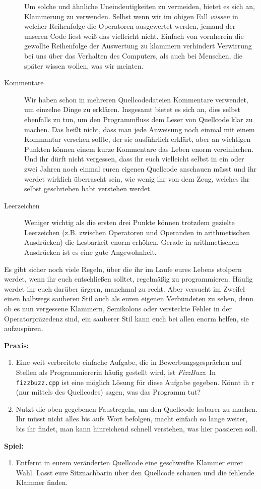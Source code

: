 \begin{description}
        Um solche und ähnliche Uneindeutigkeiten zu vermeiden, bietet es sich
        an, Klammerung zu verwenden. Selbst wenn wir im obigen Fall
        \emph{wissen} in welcher Reihenfolge die Operatoren ausgewertet werden,
        jemand der unseren Code liest weiß das vielleicht nicht. Einfach von
        vornherein die gewollte Reihenfolge der Auswertung zu klammern
        verhindert Verwirrung bei uns über das Verhalten des Computers, als
        auch bei Menschen, die später wissen wollen, was wir meinten.
    \item[Kommentare]
        Wir haben schon in mehreren Quellcodedateien Kommentare verwendet, um
        einzelne Dinge zu erklären. Insgesamt bietet es sich an, dies selbst
        ebenfalls zu tun, um den Programmfluss dem Leser von Quellcode klar zu
        machen. Das heißt nicht, dass man jede Anweisung noch einmal mit einem
        Kommantar versehen sollte, der sie ausführlich erklärt, aber an
        wichtigen Punkten können einem kurze Kommentare das Leben enorm
        vereinfachen. Und ihr dürft nicht vergessen, dass ihr euch vielleicht
        selbst in ein oder zwei Jahren noch einmal euren eigenen Quellcode
        anschauen müsst und ihr werdet wirklich überrascht sein, wie wenig ihr
        von dem Zeug, welches ihr selbst geschrieben habt verstehen werdet.
    \item[Leerzeichen]
        Weniger wichtig als die ersten drei Punkte können trotzdem gezielte
        Leerzeichen (z.B. zwischen Operatoren und Operanden in arithmetischen
        Ausdrücken) die Lesbarkeit enorm erhöhen. Gerade in arithmetischen
        Ausdrücken ist es eine gute Angewohnheit.
\end{description}

Es gibt sicher noch viele Regeln, über die ihr im Laufe eures Lebens stolpern
werdet, wenn ihr euch entschließen solltet, regelmäßig zu programmieren. Häufig
werdet ihr euch darüber ärgern, manchmal zu recht. Aber versucht im Zweifel
einen halbwegs sauberen Stil auch als euren eigenen Verbündeten zu sehen, denn
ob es nun vergessene Klammern, Semikolons oder versteckte Fehler in der
Operatorpräzedenz sind, ein sauberer Stil kann euch bei allen enorm helfen, sie
aufzuspüren.

\textbf{Praxis:}
\begin{enumerate}
    \item Eine weit verbreitete einfache Aufgabe, die in Bewerbungsgesprächen
        auf Stellen als Programmiererin häufig gestellt wird, ist
        \emph{FizzBuzz}. In \texttt{fizzbuzz.cpp} ist eine möglich Lösung für
        diese Aufgabe gegeben. Könnt ih r (nur mittels des Quellcodes) sagen,
        was das Programm tut?
    \item Nutzt die oben gegebenen Faustregeln, um den Quellcode lesbarer zu
        machen. Ihr müsst nicht alles bis aufs Wort befolgen, macht einfach so
        lange weiter, bis ihr findet, man kann hinreichend schnell verstehen,
        was hier passieren soll.
\end{enumerate}


\textbf{Spiel:}
\begin{enumerate}
    \item Entfernt in eurem veränderten Quellcode eine geschweifte Klammer
        eurer Wahl. Lasst eure Sitznachbarin über den Quellcode schauen und die
        fehlende Klammer finden.
\end{enumerate}
